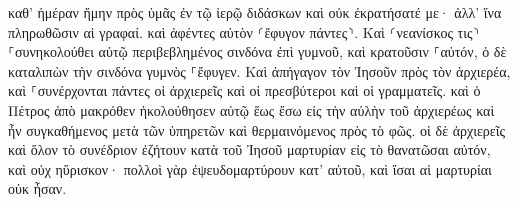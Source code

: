\documentclass{openreader}
\begin{document}
καθ’ ἡμέραν ἤμην πρὸς ὑμᾶς ἐν τῷ ἱερῷ διδάσκων καὶ οὐκ ἐκρατήσατέ με· ἀλλ’ ἵνα πληρωθῶσιν αἱ γραφαί. 
καὶ ἀφέντες αὐτὸν ⸂ἔφυγον πάντες⸃. 
Καὶ ⸂νεανίσκος τις⸃ ⸀συνηκολούθει αὐτῷ περιβεβλημένος σινδόνα ἐπὶ γυμνοῦ, καὶ κρατοῦσιν ⸀αὐτόν, 
ὁ δὲ καταλιπὼν τὴν σινδόνα γυμνὸς ⸀ἔφυγεν. 
Καὶ ἀπήγαγον τὸν Ἰησοῦν πρὸς τὸν ἀρχιερέα, καὶ ⸀συνέρχονται πάντες οἱ ἀρχιερεῖς καὶ οἱ πρεσβύτεροι καὶ οἱ γραμματεῖς. 
καὶ ὁ Πέτρος ἀπὸ μακρόθεν ἠκολούθησεν αὐτῷ ἕως ἔσω εἰς τὴν αὐλὴν τοῦ ἀρχιερέως καὶ ἦν συγκαθήμενος μετὰ τῶν ὑπηρετῶν καὶ θερμαινόμενος πρὸς τὸ φῶς. 
οἱ δὲ ἀρχιερεῖς καὶ ὅλον τὸ συνέδριον ἐζήτουν κατὰ τοῦ Ἰησοῦ μαρτυρίαν εἰς τὸ θανατῶσαι αὐτόν, καὶ οὐχ ηὕρισκον· 
πολλοὶ γὰρ ἐψευδομαρτύρουν κατ’ αὐτοῦ, καὶ ἴσαι αἱ μαρτυρίαι οὐκ ἦσαν. 
\end{document}
